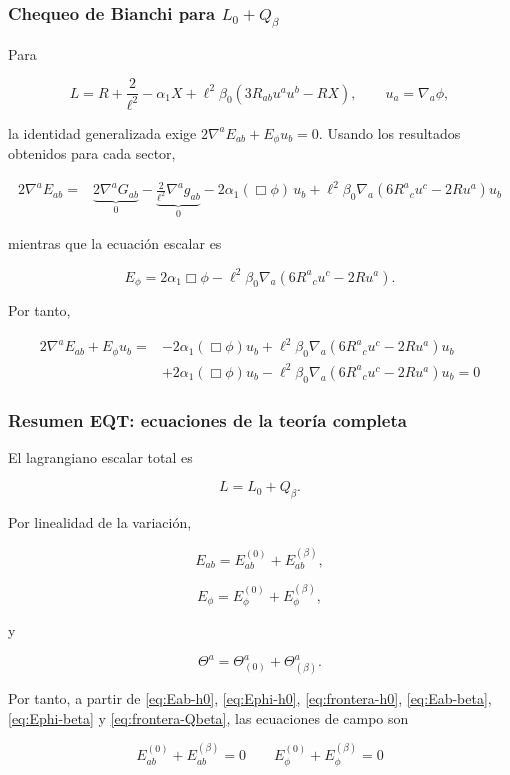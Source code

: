 \documentclass{beamer}
\newcommand{\Eq}[1]{\eqref{#1}}
\newcommand{\DenseDisplaySpacing}{%
\setlength{\abovedisplayskip}{1pt}%
\setlength{\belowdisplayskip}{1pt}%
\setlength{\abovedisplayshortskip}{0pt}%
\setlength{\belowdisplayshortskip}{0pt}%
\setlength{\jot}{1pt}%
}
\begin{document}
\begin{frame}[label=nav-frame-114]
	\frametitle{Chequeo de Bianchi para $L_0+Q_\beta$}
\linespread{.94}\selectfont\DenseDisplaySpacing
	\small

	Para

	\[
	L
	=
	R+\frac{2}{\ell^2}
	-\alpha_1 X
	+
	\ell^2\beta_0
	\left(
	3R_{ab}u^au^b-RX
	\right),
	\qquad
	u_a=\nabla_a\phi,
	\]

	la identidad generalizada exige $2\nabla^aE_{ab}+E_\phi u_b=0$.	Usando los resultados obtenidos para cada sector,

	\begin{align*}
		2\nabla^aE_{ab}
		={}&
		\underbrace{2\nabla^aG_{ab}}_{0}
		- \underbrace{\frac{2}{\ell^2}\nabla^ag_{ab}}_{0}
		- 2\alpha_1(\Box\phi)\,u_b
		+ \ell^2\beta_0 \nabla_a \left(6R^a{}_c u^c-2Ru^a\right)u_b
	\end{align*}

	mientras que la ecuación escalar es

	\[
	E_\phi
	=
	2\alpha_1\Box\phi
	-
	\ell^2\beta_0
	\nabla_a
	\left(
	6R^a{}_c u^c-2Ru^a
	\right).
	\]

	Por tanto,

	\begin{align*}
		2\nabla^aE_{ab}+E_\phi u_b
		={}&
		-2\alpha_1(\Box\phi)u_b
		+
		\ell^2\beta_0
		\nabla_a
		\left(
		6R^a{}_c u^c-2Ru^a
		\right)u_b
		\\
		&+
		2\alpha_1(\Box\phi)u_b
		-
		\ell^2\beta_0
		\nabla_a
		\left(
		6R^a{}_c u^c-2Ru^a
		\right)u_b
		=0
	\end{align*}

\end{frame}









\begin{frame}[label=nav-frame-115]
\frametitle{Resumen EQT: ecuaciones de la teoría completa}
\small
\linespread{.94}\selectfont\DenseDisplaySpacing

El lagrangiano escalar total es

\[
L
=
L_0+Q_\beta.
\]

Por linealidad de la variación,

\[
E_{ab}
=
E^{(0)}_{ab}
+
E^{(\beta)}_{ab},
\]

\[
E_\phi
=
E^{(0)}_\phi
+
E^{(\beta)}_\phi,
\]

y

\[
\Theta^a
=
\Theta^a_{(0)}
+
\Theta^a_{(\beta)}.
\]

Por tanto, a partir de \Eq{eq:Eab-h0}, \Eq{eq:Ephi-h0}, \Eq{eq:frontera-h0}, \Eq{eq:Eab-beta}, \Eq{eq:Ephi-beta} y \Eq{eq:frontera-Qbeta}, las ecuaciones de campo son

\[
\boxed{
E^{(0)}_{ab}+E^{(\beta)}_{ab}=0
}
\qquad
\boxed{
E^{(0)}_\phi+E^{(\beta)}_\phi=0
}
\]

\end{frame}

\end{document}
